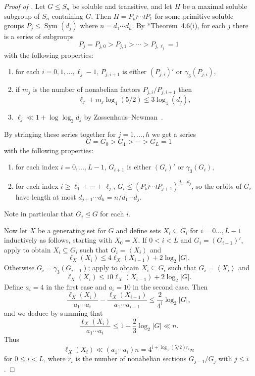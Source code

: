 \documentclass[11pt,reqno]{amsart}
\numberwithin{equation}{section}
\theoremstyle{definition}
\theoremstyle{remark}
\newcommand\opr[1]{\operatorname{#1}}
\def\Sym{\opr{Sym}}
\def\nsgp{\trianglelefteq}
\def\len{\ell}
\newcommand\gen[1]{\left\langle#1\right\rangle}
\numberwithin{equation}{section}
\begin{document}
\begin{proof}[Proof of ]
    Let $G \le S_n$ be soluble and transitive,
    and let $H$ be a maximal soluble subgroup of $S_n$ containing $G$. Then $H = P_h \wr \cdots \wr P_1$ for some primitive soluble groups $P_j \le \Sym(d_j)$ where $n = d_1 \cdots d_h$.
    By \cite{EM25}*{Theorem~4.6}(i), for each $j$ there is a series of subgroups
    \[
        P_j = P_{j,0} > P_{j,1} > \cdots > P_{j,\ell_j} = 1
    \]
    with the following properties:
    \begin{enumerate}
        \item for each $i = 0, 1, \dots, \ell_j - 1$, $P_{j,i+1}$ is either $(P_{j,i})'$ or $\gamma_3(P_{j,i})$,
        \item if $m_j$ is the number of nonabelian factors $P_{j,i} / P_{j,i+1}$ then
        \[
            \ell_j + m_j \log_4(5/2) \le 3 \log_4(d_j),
        \]
        \item $\ell_j \ll 1 + \log \log_2 d_j$ by Zassenhaus--Newman~\cite{newman}.
    \end{enumerate}
    By stringing these series together for $j = 1, \dots, h$ we get a series
    \[
        G = G_0 > G_1 > \cdots > G_L = 1
    \]
    with the following properties:
    \begin{enumerate}[resume]
        \item for each index $i = 0, \dots, L-1$, $G_{i+1}$ is either $(G_i)'$ or $\gamma_3(G_i)$,
        \item for each index $i \ge \ell_1 + \cdots + \ell_j$, $G_i \le (P_h \wr \cdots \wr P_{j+1})^{d_1\cdots d_j}$, so the orbits of $G_i$ have length at most $d_{j+1} \cdots d_h = n / d_1 \cdots d_j$.
    \end{enumerate}
    Note in particular that $G_i \nsgp G$ for each $i$.

    Now let $X$ be a generating set for $G$ and define sets $X_i \subseteq G_i$ for $i = 0 \dots, L-1$ inductively as follows, starting with $X_0 = X$.
    If $0 < i < L$ and $G_i = (G_{i-1})'$, apply  to obtain $X_i \subseteq G_i$ such that $G_i = \gen{X_i}$ and
    \[
        \len_X(X_i) \le 4 \len_X(X_{i-1}) + 2 \log_2 |G|.
    \]
    Otherwise $G_i = \gamma_3(G_{i-1})$; apply  to obtain $X_i \subseteq G_i$ such that $G_i = \gen{X_i}$ and
    \[
        \len_X(X_i) \le 10 \len_X(X_{i-1}) + 2 \log_2 |G|.
    \]
    Define $a_i = 4$ in the first case and $a_i = 10$ in the second case.
    Then
    \[
        \frac{\len_X(X_i)}{a_1 \cdots a_i} - \frac{\len_X(X_{i-1})}{a_1 \cdots a_{i-1}} \le \frac2{4^i} \log_2 |G|,
    \]
    and we deduce by summing that
    \[
        \frac{\len_X(X_i)}{a_1 \cdots a_i} \le 1 + \frac23 \log_2 |G| \ll n.
    \]
    Thus
    \[
        \len_X(X_i) \ll (a_1 \cdots a_i) n = 4^{i + \log_4(5/2) r_i} n
    \]
    for $0 \le i < L$, where $r_i$ is the number of nonabelian sections $G_{j-1} / G_j$ with $j \le i$.


\end{proof}
\end{document}
